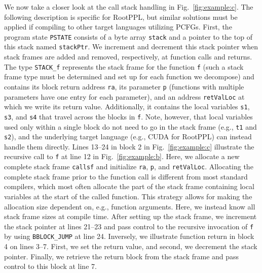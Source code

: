 \documentclass[runningheads]{llncs}
\newcommand{\rlstinline}{\lstinline[language=RootPPL]}
\begin{document}
We now take a closer look at the call stack handling in Fig.~\ref{fig:example:c}.
The following description is specific for RootPPL, but similar solutions must be applied if compiling to other target languages utilizing PCFGs.
First, the program state \rlstinline!PSTATE! consists of a byte array \lstinline!stack! and a pointer to the top of this stack named \lstinline!stackPtr!.
We increment and decrement this stack pointer when stack frames are added and removed, respectively, at function calls and returns.
The type \lstinline!STACK_f! represents the stack frame for the function \lstinline!f! (such a stack frame type must be determined and set up for each function we decompose) and contains its block return address \lstinline!ra!, its parameter \lstinline!p! (functions with multiple parameters have one entry for each parameter), and an address \lstinline!retValLoc! at which we write its return value.
Additionally, it contains the local variables \lstinline!s1!, \lstinline!s3!, and \lstinline!s4! that travel across the blocks in \lstinline!f!.
Note, however, that local variables used only within a single block do not need to go in the stack frame (e.g., \lstinline!t1! and \lstinline!s2!), and the underlying target language (e.g., CUDA for RootPPL) can instead handle them directly.
Lines 13--24 in block 2 in Fig.~\ref{fig:example:c} illustrate the recursive call to \lstinline!f! at line 12 in Fig.~\ref{fig:example:b}.
Here, we allocate a new complete stack frame \lstinline!callsf! and initialize \lstinline!ra!, \lstinline!p!, and \lstinline!retValLoc!.
Allocating the complete stack frame prior to the function call is different from most standard compilers, which most often allocate the part of the stack frame containing local variables at the start of the called function.
This strategy allows for making the allocation size dependent on, e.g., function arguments.
Here, we instead know all stack frame sizes at compile time.
After setting up the stack frame, we increment the stack pointer at lines 21--23 and pass control to the recursive invocation of \lstinline!f! by using \rlstinline!BBLOCK_JUMP! at line 24.
Inversely, we illustrate function return in block 4 on lines 3--7.
First, we set the return value, and second, we decrement the stack pointer.
Finally, we retrieve the return block from the stack frame and pass control to this block at line 7.
\end{document}
